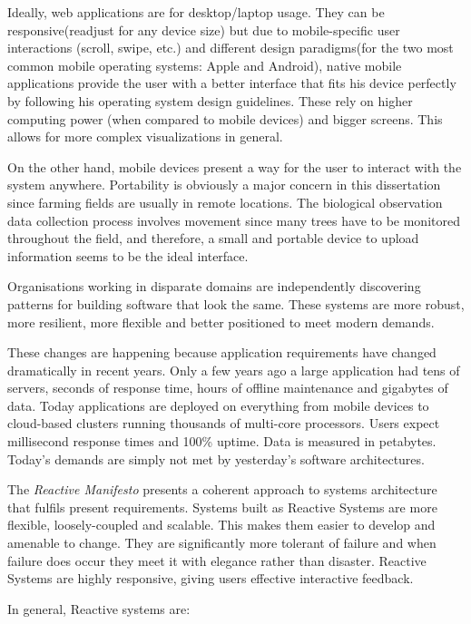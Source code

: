 Ideally, web applications are for desktop/laptop usage. They can be responsive(readjust for any device size) but due to mobile-specific user interactions (scroll, swipe, etc.) and different design paradigms(for the two most common mobile operating systems: Apple and Android), native mobile applications provide the user with a better interface that fits his device perfectly by following his operating system design guidelines. These rely on higher computing power (when compared to mobile devices) and bigger screens. This allows for more complex visualizations in general. 

On the other hand, mobile devices present a way for the user to interact with the system anywhere. Portability is obviously a major concern in this dissertation since farming fields are usually in remote locations. The biological observation data collection process involves movement since many trees have to be monitored throughout the field, and therefore, a small and portable device to upload information seems to be the ideal interface.

Organisations working in disparate domains are independently discovering patterns for building software that look the same. These systems are more robust, more resilient, more flexible and better positioned to meet modern demands.

These changes are happening because application requirements have changed dramatically in recent years. Only a few years ago a large application had tens of servers, seconds of response time, hours of offline maintenance and gigabytes of data. Today applications are deployed on everything from mobile devices to cloud-based clusters running thousands of multi-core processors. Users expect millisecond response times and 100\% uptime. Data is measured in petabytes. Today's demands are simply not met by yesterday’s software architectures.

The \textit{Reactive Manifesto} presents a coherent approach to systems architecture that fulfils present requirements. Systems built as Reactive Systems are more flexible, loosely-coupled and scalable. This makes them easier to develop and amenable to change. They are significantly more tolerant of failure and when failure does occur they meet it with elegance rather than disaster. Reactive Systems are highly responsive, giving users effective interactive feedback.

In general, Reactive systems are:

